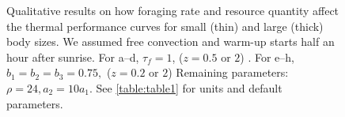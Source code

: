 \vspace{-0.8cm}
\begin{figure}%
\begin{center}
\caption{
    \setstretch{\stretchby}
	Qualitative results on how foraging rate and resource quantity affect the thermal performance curves for small (thin) and large (thick) body sizes.
  We assumed free convection and warm-up starts half an hour after sunrise.
  For a--d, $\tau_f = 1$, ($z = 0.5 \mbox{ or } 2$) .
	For e--h, $b_1 = b_2 = b_3 = 0.75,$ ($z = 0.2 \mbox{ or } 2$)
	Remaining parameters: $\rho = 24, a_2 = 10 a_1$.
	See \cref{table:table1} for units and default parameters.
}
\label{fig5}
\end{center}
\end{figure}
